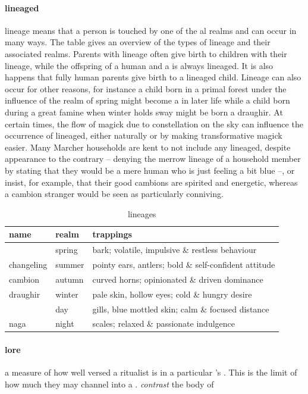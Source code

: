 \paragraph{lineaged} lineage means that a person is touched by one of the al realms and can occur in many ways. The table gives an overview of the types of lineage and their associated realms. Parents with lineage often give birth to children with their lineage, while the offspring of a human and a  is always lineaged. It is also happens that fully human parents give birth to a lineaged child. Lineage can also occur for other reasons, for instance a child born in a primal forest under the influence of the realm of spring might become a  in later life while a child born during a great famine when winter holds sway might be born a draughir. At certain times, the flow of magick due to constellation on the sky can influence the occurrence of lineaged, either naturally or by making transformative magick easier. Many Marcher households are kent to not include any lineaged, despite appearance to the contrary – denying the merrow lineage of a household member by stating that they would be a mere human who is just feeling a bit blue –, or insist, for example, that their good cambions are spirited and energetic, whereas a cambion stranger would be seen as particularly conniving.\begin{table}\begin{tabular}{lll} name& realm& trappings\\ \hline \s{briar}& spring& bark; volatile, impulsive \& restless behaviour\\ changeling& summer& pointy ears, antlers; bold \& self-confident attitude\\ cambion& autumn& curved horns; opinionated \& driven dominance\\ draughir& winter& pale skin, hollow eyes; cold \& hungry desire\\ \s{merrow}& day& gills, blue mottled skin; calm \& focused distance\\ naga& night& scales; relaxed \& passionate indulgence\end{tabular}\caption{lineages}\end{table}
\paragraph{lore} a measure of how well versed a ritualist is in a particular 's . This is the limit of how much  they may channel into a . \textit{contrast} the body of 
